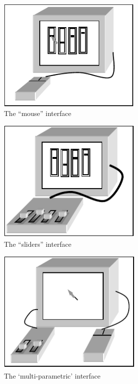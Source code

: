 \begin{figure}[t]
\centering
\includegraphics[width=70mm]{img-3-eps-converted-to-crop.pdf}
\caption{The ``mouse'' interface}
\label{Hunt:img-3}       %
\end{figure}



\begin{figure}[t]
\centering
\includegraphics[width=70mm]{img-4-eps-converted-to-crop.pdf}
\caption{The ``sliders'' interface}
\label{Hunt:img-4}       %
\end{figure}



\begin{figure}[t]
\centering
\includegraphics[width=70mm]{img-5-eps-converted-to-crop.pdf}
\caption{The `multi-parametric' interface}
\label{Hunt:img-5}       %
\end{figure}



